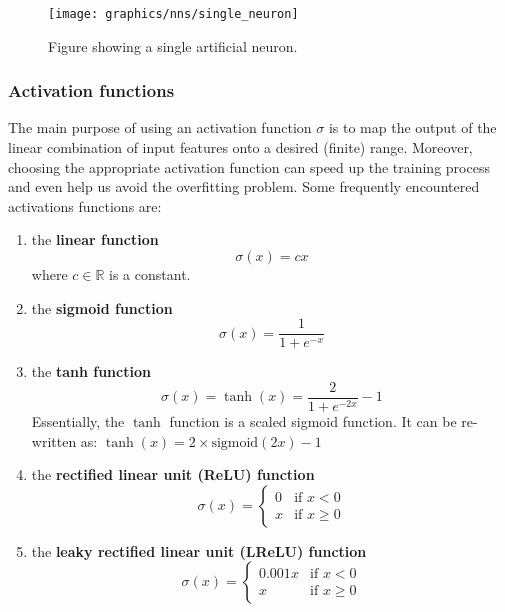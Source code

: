 	\begin{figure}[H]
		\centering
		
		\texttt{[image: graphics/nns/single\_neuron]}
		\caption[\textbf{Artificial neuron}]{
			Figure showing a single artificial neuron. 
		}
		\label{Fig: prep/ml/mlp/neuron}
	\end{figure}
	\subsubsection*{Activation functions}
	The main purpose of using an activation function $\sigma$ is to map the output of the linear combination of input features onto a desired (finite) range. Moreover, choosing the appropriate activation function can speed up the training process and even help us avoid the overfitting problem. Some frequently encountered activations functions are:
	\begin{enumerate}
		\item the \textbf{linear function}
		\begin{equation}
		\sigma(x) = cx 
		\end{equation}
		where $c \in \mathbb{R}$ is a constant. 
		
		\item the \textbf{sigmoid function}
		\begin{equation}
		\sigma(x) = \frac{1}{1+e^{-x}}
		\end{equation}
		
		\item the \textbf{tanh function}
		\begin{equation}
		\sigma(x) = \tanh(x) = \frac{2}{1+e^{-2x}} - 1
		\end{equation}
		Essentially, the $\tanh$ function is a scaled sigmoid function. It can be re-written as: $\tanh(x) = 2 \times \text{sigmoid}(2x) - 1$ 
		
		\item the \textbf{rectified linear unit (ReLU) function}
		\begin{equation}
		\sigma(x) = 
		\begin{cases}
		0 & \text{if } x < 0 \\
		x & \text{if } x \geq 0
		\end{cases}
		\end{equation}
		
		\item the \textbf{leaky rectified linear unit (LReLU) function}
		\begin{equation}
		\sigma(x) = 
		\begin{cases}
		0.001x & \text{if } x < 0 \\
		x & \text{if } x \geq 0
		\end{cases}
		\end{equation}
	\end{enumerate} 
